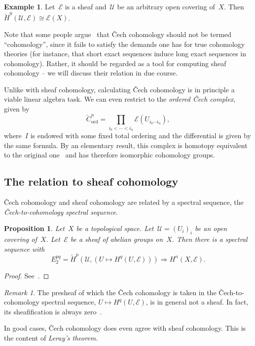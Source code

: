 \documentclass[10pt]{amsart}
\theoremstyle{definition}
\newtheorem{ex}[defn]{Example}
\theoremstyle{plain}
\newtheorem{prop}[defn]{Proposition}
\theoremstyle{remark}
\newtheorem{rem}[defn]{Remark}
\newcommand{\E}{\mathcal{E}}
\newcommand{\U}{\mathcal{U}}
\newcommand{\stackhref}[1]{\href{http://stacks.math.columbia.edu/tag/#1}{#1}}
\begin{document}
\begin{ex}Let~$\E$ is a sheaf and~$\U$ be an arbitrary open covering of~$X$.
Then~$\check H^0(\U,\E) \cong \E(X)$.\end{ex}

Note that some people argue~\cite{nLab:cech} that Čech cohomology should not be
termed ``cohomology'', since it fails to satisfy the demands one has for true
cohomology theories (for instance, that short exact sequences induce long exact
sequences in cohomology). Rather, it should be regarded as a tool for computing
sheaf cohomology -- we will discuss their relation in due course.

Unlike with sheaf cohomology, calculating Čech cohomology is in principle a
viable linear algebra task. We can even restrict to the \emph{ordered Čech
complex}, given by
\[ \check C^n_{\text{ord}} = \prod_{i_0 < \cdots < i_n} \E(U_{i_0 \cdots i_n}),
\]
where~$I$ is endowed with some fixed total ordering and the differential is
given by the same formula. By an elementary result, this complex is homotopy
equivalent to the original one~\cite[Tag~\stackhref{01FG}]{stacks-project} and
has therefore isomorphic cohomology groups.


\subsection{The relation to sheaf cohomology}

Čech cohomology and sheaf cohomology are related by a spectral sequence, the
\emph{Čech-to-cohomology spectral sequence}.
\begin{prop}Let~$X$ be a topological space. Let~$\U = (U_i)_i$ be an open
covering of~$X$. Let~$\E$ be a sheaf of abelian groups on~$X$. Then there is a
spectral sequence with
\[ E_2^{pq} = \check H^p(\U, (U \mapsto H^q(U,\E))) \Longrightarrow
  H^n(X, \E). \]
\end{prop}
\begin{proof}See~\cite[Tag~\stackhref{01ES}]{stacks-project}.
\end{proof}

\begin{rem}The presheaf of which the Čech cohomology is taken in the
Čech-to-cohomology spectral sequence, $U \mapsto H^q(U,\E)$, is in general not
a sheaf. In fact, its sheafification is always
zero~\cite[Tag~\stackhref{03BA}]{stacks-project}.\end{rem}

In good cases, Čech cohomology does even agree with sheaf cohomology. This is
the content of \emph{Leray's theorem}.
\end{document}
